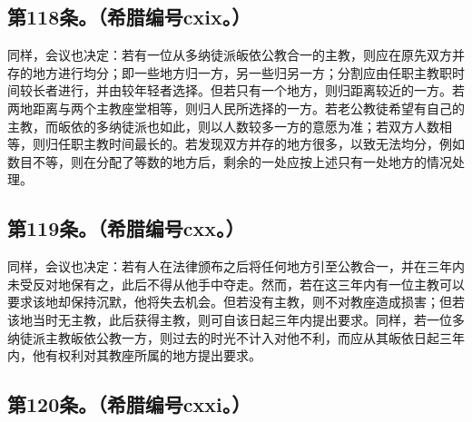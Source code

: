 
\subsection{第118条。（希腊编号cxix。）}

\par

同样，会议也决定：若有一位从多纳徒派皈依公教合一的主教，则应在原先双方并存的地方进行均分；即一些地方归一方，另一些归另一方；分割应由任职主教职时间较长者进行，并由较年轻者选择。但若只有一个地方，则归距离较近的一方。若两地距离与两个主教座堂相等，则归人民所选择的一方。若老公教徒希望有自己的主教，而皈依的多纳徒派也如此，则以人数较多一方的意愿为准；若双方人数相等，则归任职主教时间最长的。若发现双方并存的地方很多，以致无法均分，例如数目不等，则在分配了等数的地方后，剩余的一处应按上述只有一处地方的情况处理。\par


\subsection{第119条。（希腊编号cxx。）}

\par

同样，会议也决定：若有人在法律颁布之后将任何地方引至公教合一，并在三年内未受反对地保有之，此后不得从他手中夺走。然而，若在这三年内有一位主教可以要求该地却保持沉默，他将失去机会。但若没有主教，则不对教座造成损害；但若该地当时无主教，此后获得主教，则可自该日起三年内提出要求。同样，若一位多纳徒派主教皈依公教一方，则过去的时光不计入对他不利，而应从其皈依日起三年内，他有权利对其教座所属的地方提出要求。\par


\subsection{第120条。（希腊编号cxxi。）}

\par

